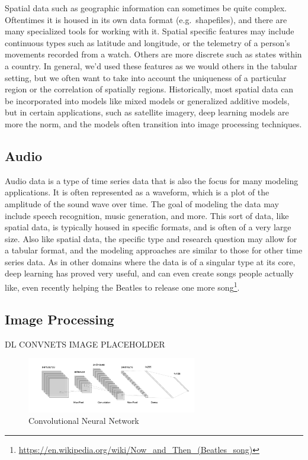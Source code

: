 \documentclass[
  letterpaper,
]{krantz}
\DeclareRobustCommand{\href}[2]{#2\footnote{\url{#1}}}
\begin{document}
Spatial data such as geographic information can sometimes be quite
complex. Oftentimes it is housed in its own data format
(e.g.~shapefiles), and there are many specialized tools for working with
it. Spatial specific features may include continuous types such as
latitude and longitude, or the telemetry of a person's movements
recorded from a watch. Others are more discrete such as states within a
country. In general, we'd used these features as we would others in the
tabular setting, but we often want to take into account the uniqueness
of a particular region or the correlation of spatially regions.
Historically, most spatial data can be incorporated into models like
mixed models or generalized additive models, but in certain
applications, such as satellite imagery, deep learning models are more
the norm, and the models often transition into image processing
techniques.

\subsection{Audio}\label{audio}

Audio data is a type of time series data that is also the focus for many
modeling applications. It is often represented as a waveform, which is a
plot of the amplitude of the sound wave over time. The goal of modeling
the data may include speech recognition, music generation, and more.
This sort of data, like spatial data, is typically housed in specific
formats, and is often of a very large size. Also like spatial data, the
specific type and research question may allow for a tabular format, and
the modeling approaches are similar to those for other time series data.
As in other domains where the data is of a singular type at its core,
deep learning has proved very useful, and can even create songs people
actually like,
\href{https://en.wikipedia.org/wiki/Now_and_Then_(Beatles_song)}{even
recently helping the Beatles to release one more song}.

\subsection{Image Processing}\label{image-processing}

DL CONVNETS IMAGE PLACEHOLDER

\begin{figure}

{\centering \includegraphics[width=0.66\textwidth,height=\textheight]{img/cnn.png}

}

\caption{\label{fig-cnn}Convolutional Neural Network}

\end{figure}
\end{document}
